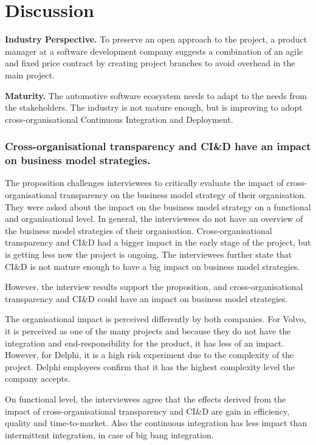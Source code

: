 \section{Discussion}\label{sec:discussion}


{\bf Industry Perspective.} 
 To preserve an open approach to the project, a product manager at a software development company suggests a combination of an agile and fixed price contract by creating project branches to avoid overhead in the main project.

 {\bf Maturity.} The automotive software ecosystem needs to adapt to the needs from the stakeholders. The industry is not mature enough, but is improving to adopt cross-organisational Continuous Integration and Deployment.

\subsubsection{Cross-organisational transparency and CI\&D have an impact on business model strategies.}

The proposition challenges interviewees to critically evaluate the impact of cross-organisational transparency on the business model strategy of their organisation. They were asked about the impact on the business model strategy on a functional and organisational level. In general, the interviewees do not have an overview of the business model strategies of their organisation. Cross-organisational transparency and CI\&D had a bigger impact in the early stage of the project, but is getting less now the project is ongoing. The interviewees further state that CI\&D is not mature enough to have a big impact on business model strategies. 

However, the interview results support the proposition, and cross-organisational transparency and CI\&D could have an impact on business model strategies. %

 The organisational impact is perceived differently by both companies. For Volvo, it is perceived as one of the many projects and because they do not have the integration and end-responsibility for the product, it has less of an impact. However, for Delphi, it is a high risk experiment due to the complexity of the project. Delphi employees confirm that it has the highest complexity level the company accepts.

 On functional level, the interviewees agree that the effects derived from the impact of cross-organisational transparency and CI\&D are gain in efficiency, quality and time-to-market. Also the continuous integration has less impact than intermittent integration, in case of big bang integration.  


 